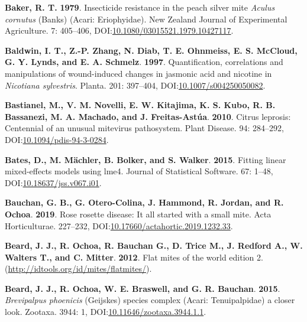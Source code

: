 \documentclass[12pt,final,CPage]{ufthesis}
\newlength{\cslhangindent}
\newenvironment{CSLReferences}[2] %
{%
	\setlength{\parindent}{0pt}
	\ifodd #1 \everypar{\setlength{\hangindent}{\cslhangindent}}\ignorespaces\fi
	\ifnum #2 > 0
	\setlength{\parskip}{#2\baselineskip}
	\fi
}%
{}
\begin{document}
{\begin{CSLReferences}{1}{0}
  \leavevmode{}%
  \textbf{Baker, R. T.} \textbf{1979}. Insecticide resistance in the peach silver mite {\emph{Aculus cornutus}} {(Banks)} ({Acari}: {Eriophyidae}). New Zealand Journal of Experimental Agriculture. 7: 405--406, DOI:\href{https://doi.org/10.1080/03015521.1979.10427117}{10.1080/03015521.1979.10427117}.

  \leavevmode{}%
  \textbf{Baldwin, I. T., Z.-P. Zhang, N. Diab, T. E. Ohnmeiss, E. S. McCloud, G. Y. Lynds, and E. A. Schmelz}. \textbf{1997}. Quantification, correlations and manipulations of wound-induced changes in jasmonic acid and nicotine in {\emph{Nicotiana sylvestris}}. Planta. 201: 397--404, DOI:\href{https://doi.org/10.1007/s004250050082}{10.1007/s004250050082}.

  \leavevmode{}%
  \textbf{Bastianel, M., V. M. Novelli, E. W. Kitajima, K. S. Kubo, R. B. Bassanezi, M. A. Machado, and J. Freitas-Astúa}. \textbf{2010}. {Citrus leprosis}: Centennial of an unusual mite{\textendash}virus pathosystem. Plant Disease. 94: 284--292, DOI:\href{https://doi.org/10.1094/pdis-94-3-0284}{10.1094/pdis-94-3-0284}.

  \leavevmode{}%
  \textbf{Bates, D., M. Mächler, B. Bolker, and S. Walker}. \textbf{2015}. Fitting linear mixed-effects models using {lme4}. Journal of Statistical Software. 67: 1--48, DOI:\href{https://doi.org/10.18637/jss.v067.i01}{10.18637/jss.v067.i01}.

  \leavevmode{}%
  \textbf{Bauchan, G. B., G. Otero-Colina, J. Hammond, R. Jordan, and R. Ochoa}. \textbf{2019}. {Rose rosette disease}: It all started with a small mite. Acta Horticulturae. 227--232, DOI:\href{https://doi.org/10.17660/actahortic.2019.1232.33}{10.17660/actahortic.2019.1232.33}.

  \leavevmode{}%
  \textbf{Beard, J. J., R. Ochoa, R. Bauchan G., D. Trice M., J. Redford A., W. Walters T., and C. Mitter}. \textbf{2012}. Flat mites of the world edition 2. (\url{http://idtools.org/id/mites/flatmites/}).

  \leavevmode{}%
  \textbf{Beard, J. J., R. Ochoa, W. E. Braswell, and G. R. Bauchan}. \textbf{2015}. {\emph{Brevipalpus phoenicis}} {(Geijskes)} species complex ({Acari}: {Tenuipalpidae}) \textemdash a closer look. Zootaxa. 3944: 1, DOI:\href{https://doi.org/10.11646/zootaxa.3944.1.1}{10.11646/zootaxa.3944.1.1}.


\end{CSLReferences}}
\end{document}
